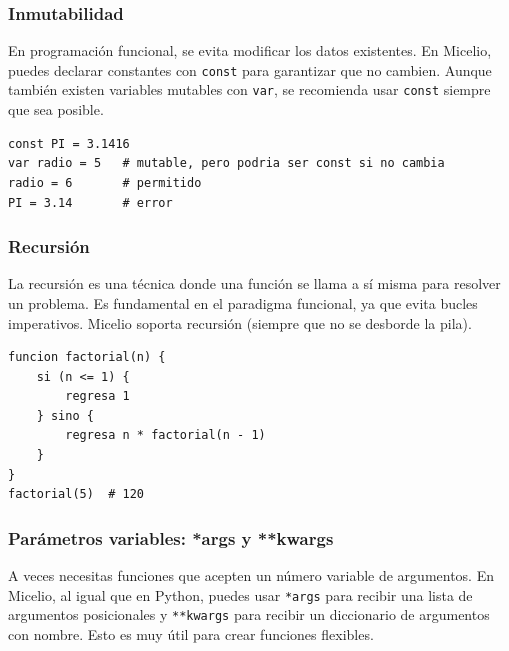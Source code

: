 \documentclass[12pt]{article}
\begin{document}
\subsubsection*{Inmutabilidad}
En programación funcional, se evita modificar los datos existentes. En Micelio, puedes declarar constantes con \texttt{const} para garantizar que no cambien. Aunque también existen variables mutables con \texttt{var}, se recomienda usar \texttt{const} siempre que sea posible.

\begin{lstlisting}
const PI = 3.1416
var radio = 5   # mutable, pero podria ser const si no cambia
radio = 6       # permitido
PI = 3.14       # error
\end{lstlisting}

\subsubsection*{Recursión}
La recursión es una técnica donde una función se llama a sí misma para resolver un problema. Es fundamental en el paradigma funcional, ya que evita bucles imperativos. Micelio soporta recursión (siempre que no se desborde la pila).

\begin{lstlisting}
funcion factorial(n) {
    si (n <= 1) {
        regresa 1
    } sino {
        regresa n * factorial(n - 1)
    }
}
factorial(5)  # 120
\end{lstlisting}

\subsubsection*{Parámetros variables: *args y **kwargs}
A veces necesitas funciones que acepten un número variable de argumentos. En Micelio, al igual que en Python, puedes usar \texttt{*args} para recibir una lista de argumentos posicionales y \texttt{**kwargs} para recibir un diccionario de argumentos con nombre. Esto es muy útil para crear funciones flexibles.
\end{document}
